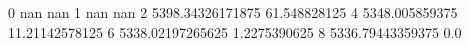 0 nan nan
1 nan nan
2 5398.34326171875 61.548828125
4 5348.005859375 11.21142578125
6 5338.02197265625 1.2275390625
8 5336.79443359375 0.0

